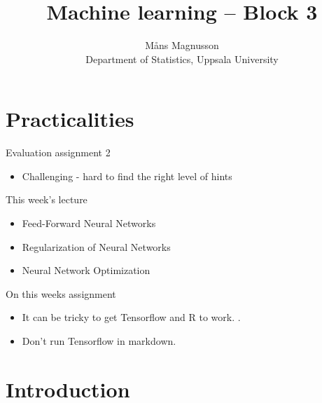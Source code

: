 \documentclass[10pt]{beamer}
\title[]{{\color{black}Machine learning -- Block 3}}
\author[]{M{\aa}ns Magnusson\\Department of Statistics, Uppsala University}
\date{\currentsemester}
\begin{document}
\frame{\titlepage
}





\section{Practicalities}

\begin{frame}{Evaluation assignment 2}
\begin{itemize}
\item Challenging - hard to find the right level of hints
\end{itemize}
\end{frame}


\begin{frame}{This week's lecture}
\begin{itemize}
\item Feed-Forward Neural Networks
\item Regularization of Neural Networks
\item Neural Network Optimization
\end{itemize}
\end{frame}


\begin{frame}{On this weeks assignment}
\begin{itemize}
\item It can be tricky to get Tensorflow and R to work. .
\item Don't run Tensorflow in markdown.
\end{itemize}
\end{frame}


\section{Introduction}
\frame{\sectionpage}



\end{document}
